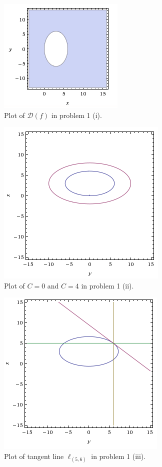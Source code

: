 \documentclass[a4paper,norsk,12pt]{article}
\begin{document}
\begin{figure}[h]
  \centering
  \includegraphics{ob1plot.png}
  \caption{Plot of $\mathcal{D}(f)$ in problem 1 (i).}
  \label{plot.p1}
\end{figure}

\begin{figure}[h]
  \centering
  \includegraphics{ob1plot2.png}
  \caption{Plot of $C=0$ and $C=4$ in problem 1 (ii).}
  \label{plot.p2}
\end{figure}

\begin{figure}[h]
  \centering
  \includegraphics{ob1plot3.png}
  \caption{Plot of tangent line $\ell_{(5,6)}$ in problem 1 (iii).}
  \label{plot.p3}
\end{figure}
\end{document}

